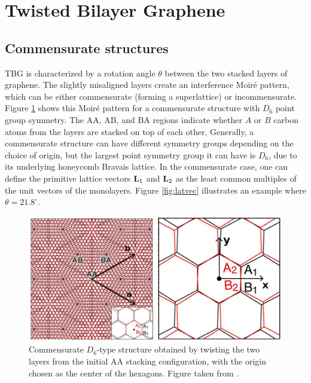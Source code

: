 \documentclass[12pt]{report}
\begin{document}
\section{Twisted Bilayer Graphene} \label{sec:tbg}

\subsection{Commensurate structures} \label{sec:tbg_geom}

TBG is characterized by a rotation angle $\theta$ between the two stacked layers of graphene. The slightly misaligned layers create an interference Moiré pattern, which can be either commensurate (forming a superlattice) or incommensurate. Figure \ref{fig:moireD6} shows this Moiré pattern for a commensurate structure with $D_6$ point group symmetry. The AA, AB, and BA regions indicate whether $A$ or $B$ carbon atoms from the layers are stacked on top of each other. Generally, a commensurate structure can have different symmetry groups depending on the choice of origin, but the largest point symmetry group it can have is $D_6$, due to its underlying honeycomb Bravais lattice. In the commensurate case, one can define the primitive lattice vectors $\vb{L}_1$ and $\vb{L}_2$ as the least common multiples of the unit vectors of the monolayers. Figure \ref{fig:latvec} illustrates an example where $\theta = 21.8^\circ$.
\begin{figure}[H]
\centering
\includegraphics[height=.32\columnwidth]{fig/moireD6.png}
\caption{Commensurate $D_6$-type structure obtained by twisting the two layers from the initial AA stacking configuration, with the origin chosen as the center of the hexagons. Figure taken from \cite{thesis_rennella}.}
\label{fig:moireD6}
\end{figure}
\end{document}
